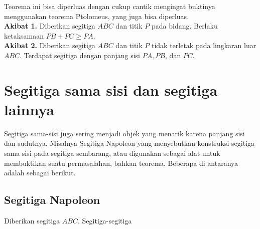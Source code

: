 \documentclass[12pt]{article}
\begin{document}
Teorema ini bisa diperluas dengan cukup cantik mengingat buktinya menggunakan teorema Ptolomeus, yang juga bisa diperluas. \\


\noindent \textbf{Akibat 1.} Diberikan segitiga $ABC$ dan titik $P$ pada bidang. Berlaku ketaksamaan $PB + PC \geq PA$. \\


\noindent \textbf{Akibat 2.} Diberikan segitiga $ABC$ dan titik $P$ tidak terletak pada lingkaran luar $ABC$. Terdapat segitiga dengan panjang sisi $PA,PB$, dan $PC$. \\




\section*{Segitiga sama sisi dan segitiga lainnya}

Segitiga sama-sisi juga sering menjadi objek yang menarik karena panjang sisi dan sudutnya. Misalnya Segitiga Napoleon yang menyebutkan konstruksi segitiga sama sisi pada segitiga sembarang, atau digunakan sebagai alat untuk membuktikan suatu permasalahan, bahkan teorema. Beberapa di antaranya adalah sebagai berikut.\\

	
\subsection*{Segitiga Napoleon}

Diberikan segitiga $ABC$. Segitiga-segitiga 
\end{document}

